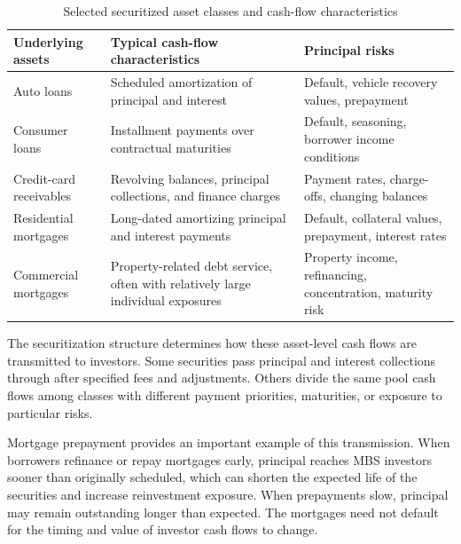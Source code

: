 \begin{table}[H]

\centering

\caption{Selected securitized asset classes and cash-flow characteristics}

\label{tab:ch20-securitized-assets}

\begin{tabularx}{\textwidth}{@{}p{3.4cm}YY@{}}

\toprule

\textbf{Underlying assets} &
\textbf{Typical cash-flow characteristics} &
\textbf{Principal risks} \\

\midrule

Auto loans &
Scheduled amortization of principal and interest &
Default, vehicle recovery values, prepayment \\

Consumer loans &
Installment payments over contractual maturities &
Default, seasoning, borrower income conditions \\

Credit-card receivables &
Revolving balances, principal collections, and finance charges &
Payment rates, charge-offs, changing balances \\

Residential mortgages &
Long-dated amortizing principal and interest payments &
Default, collateral values, prepayment, interest rates \\

Commercial mortgages &
Property-related debt service, often with relatively large individual exposures &
Property income, refinancing, concentration, maturity risk \\

\bottomrule

\end{tabularx}

\end{table}

The securitization structure determines how these asset-level cash flows are transmitted to investors. Some securities pass principal and interest collections through after specified fees and adjustments. Others divide the same pool cash flows among classes with different payment priorities, maturities, or exposure to particular risks.

Mortgage prepayment provides an important example of this transmission. When borrowers refinance or repay mortgages early, principal reaches MBS investors sooner than originally scheduled, which can shorten the expected life of the securities and increase reinvestment exposure. When prepayments slow, principal may remain outstanding longer than expected. The mortgages need not default for the timing and value of investor cash flows to change.

